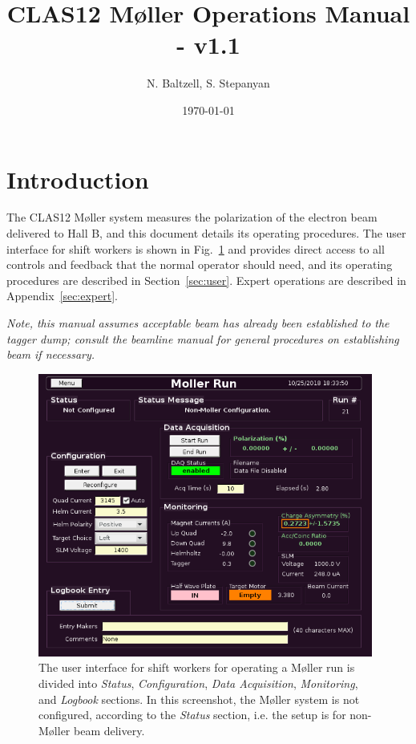 \documentclass[amsmath,amssymb,notitlepage,12pt]{revtex4}
\begin{document}
\title{CLAS12 M{\o}ller Operations Manual - v1.1}
\date{\today}
\author{N. Baltzell, S. Stepanyan}
\begin{abstract}
\end{abstract}

\maketitle

\section{Introduction}
The CLAS12 M{\o}ller system measures the polarization of the electron beam delivered to Hall B, and this document details its operating procedures.  The user interface for shift workers is shown in Fig.~\ref{fig:unconfig} and provides direct access to all controls and feedback that the normal operator should need, and its operating procedures are described in Section~\ref{sec:user}.  Expert operations are described in Appendix~\ref{sec:expert}.

{\em Note, this manual assumes acceptable beam has already been established to the tagger dump;  consult the beamline manual for general procedures on establishing beam if necessary.}

\begin{figure}[htbp]\centering
    \includegraphics[width=11cm]{pics/unconfig}
    \caption{The user interface for shift workers for operating a M{\o}ller run is divided into {\em Status}, {\em Configuration}, {\em Data Acquisition}, {\em Monitoring}, and {\em Logbook} sections.  In this screenshot, the M{\o}ller system is not configured, according to the {\em Status} section, i.e. the setup is for non-M{\o}ller beam delivery.\label{fig:unconfig}}
\end{figure}
\end{document}
